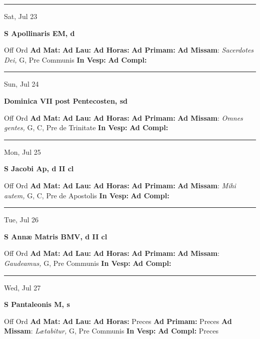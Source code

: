 \documentclass[letterpaper, 10pt]{article}
\begin{document}
\hrule
\begin{center}
Sat, Jul 23
\end{center}\textbf{ \large S Apollinaris EM, \textnormal{\normalsize d}}
\begin{justify}
Off Ord
\textbf{Ad Mat: }
\textbf{Ad Lau: }
\textbf{Ad Horas: }
\textbf{Ad Primam: }
\textbf{Ad Missam}: \textit{Sacerdotes Dei,} G, Pre Communis
\textbf{In Vesp: }
\textbf{Ad Compl: }\end{justify}



\hrule
\begin{center}
Sun, Jul 24
\end{center}\textbf{ \large Dominica VII post Pentecosten, \textnormal{\normalsize sd}}
\begin{justify}
Off Ord
\textbf{Ad Mat: }
\textbf{Ad Lau: }
\textbf{Ad Horas: }
\textbf{Ad Primam: }
\textbf{Ad Missam}: \textit{Omnes gentes,} G, C, Pre de Trinitate
\textbf{In Vesp: }
\textbf{Ad Compl: }\end{justify}



\hrule
\begin{center}
Mon, Jul 25
\end{center}\textbf{ \large S Jacobi Ap, \textnormal{\normalsize d II cl}}
\begin{justify}
Off Ord
\textbf{Ad Mat: }
\textbf{Ad Lau: }
\textbf{Ad Horas: }
\textbf{Ad Primam: }
\textbf{Ad Missam}: \textit{Mihi autem,} G, C, Pre de Apostolis
\textbf{In Vesp: }
\textbf{Ad Compl: }\end{justify}



\hrule
\begin{center}
Tue, Jul 26
\end{center}\textbf{ \large S Annæ Matris BMV, \textnormal{\normalsize d II cl}}
\begin{justify}
Off Ord
\textbf{Ad Mat: }
\textbf{Ad Lau: }
\textbf{Ad Horas: }
\textbf{Ad Primam: }
\textbf{Ad Missam}: \textit{Gaudeamus,} G, Pre Communis
\textbf{In Vesp: }
\textbf{Ad Compl: }\end{justify}



\hrule
\begin{center}
Wed, Jul 27
\end{center}\textbf{ \large S Pantaleonis M, \textnormal{\normalsize s}}
\begin{justify}
Off Ord
\textbf{Ad Mat: }
\textbf{Ad Lau: }
\textbf{Ad Horas: }Preces
\textbf{Ad Primam: }Preces
\textbf{Ad Missam}: \textit{Lætabitur,} G, Pre Communis
\textbf{In Vesp: }
\textbf{Ad Compl: }Preces\end{justify}
\end{document}
